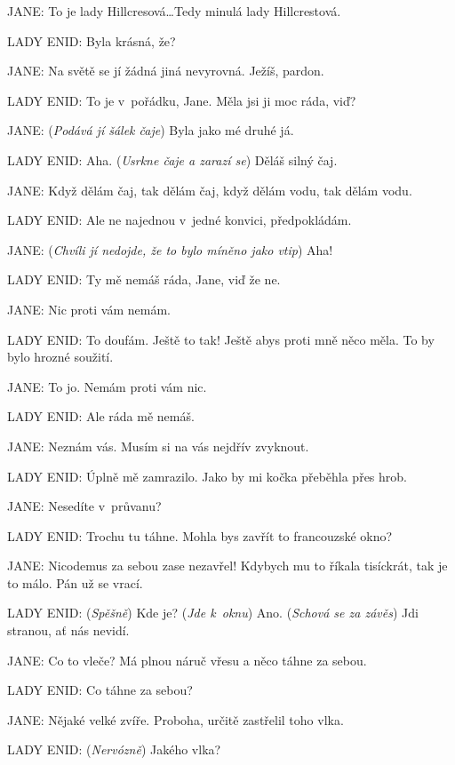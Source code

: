 \noindent
JANE: To je lady Hillcresová\ldots Tedy minulá lady Hillcrestová.

\noindent 
LADY ENID: Byla krásná, že?

\noindent
JANE: Na světě se jí žádná jiná nevyrovná. Ježíš, pardon.

\noindent
LADY ENID: To je v pořádku, Jane. Měla jsi ji moc ráda, viď?

\noindent
JANE: (\textit{Podává jí šálek čaje}) Byla jako mé druhé já.

\noindent
LADY ENID: Aha. (\textit{Usrkne čaje a zarazí se}) Děláš silný čaj.

\noindent
JANE: Když dělám čaj, tak dělám čaj, když dělám vodu, tak dělám vodu.

\noindent
LADY ENID: Ale ne najednou v jedné konvici, předpokládám.

\noindent
JANE: (\textit{Chvíli jí nedojde, že to bylo míněno jako vtip}) Aha!

\noindent
LADY ENID: Ty mě nemáš ráda, Jane, viď že ne.

\noindent
JANE: Nic proti vám nemám.

\noindent
LADY ENID: To doufám. Ještě to tak! Ještě abys proti mně něco měla. To by bylo hrozné soužití.

\noindent
JANE: To jo. Nemám proti vám nic.

\noindent
LADY ENID: Ale ráda mě nemáš.

\noindent
JANE: Neznám vás. Musím si na vás nejdřív zvyknout.

\noindent
LADY ENID: Úplně mě zamrazilo. Jako by mi kočka přeběhla přes hrob.

\noindent
JANE: Nesedíte v průvanu?

\noindent
LADY ENID: Trochu tu táhne. Mohla bys zavřít to francouzské okno?

\noindent
JANE: Nicodemus za sebou zase nezavřel! Kdybych mu to říkala tisíckrát, tak je to málo. Pán už se vrací.

\noindent
LADY ENID: (\textit{Spěšně}) Kde je? (\textit{Jde k oknu}) Ano. (\textit{Schová se za závěs}) Jdi stranou, ať nás nevidí.

\noindent
JANE: Co to vleče? Má plnou náruč vřesu a něco táhne za sebou.

\noindent
LADY ENID: Co táhne za sebou?

\noindent
JANE: Nějaké velké zvíře. Proboha, určitě zastřelil toho vlka.

\noindent
LADY ENID: (\textit{Nervózně}) Jakého vlka?

